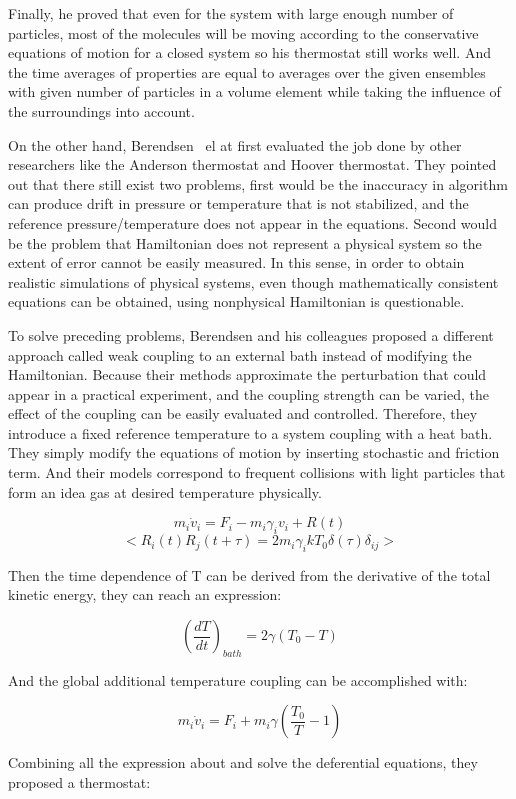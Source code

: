 \documentclass{article}
\begin{document}
\begin{spacing}{1}
Finally, he proved that even for the system with large enough number of particles, most of the molecules will be moving according to the conservative equations of motion for a closed system so his thermostat still works well. And the time averages of properties are equal to averages over the given ensembles with given number of particles in a volume element while taking the influence of the surroundings into account.

On the other hand, Berendsen~\cite{2} el at first evaluated the job done by other researchers like the Anderson thermostat and Hoover thermostat. They pointed out that there still exist two problems, first would be the inaccuracy in algorithm can produce drift in pressure or temperature that is not stabilized, and the reference pressure/temperature does not appear in the equations. Second would be the problem that Hamiltonian does not represent a physical system so the extent of error cannot be easily measured. In this sense, in order to obtain realistic simulations of physical systems, even though mathematically consistent equations can be obtained, using nonphysical Hamiltonian is questionable.

To solve preceding problems, Berendsen and his colleagues proposed a different approach called weak coupling to an external bath instead of modifying the Hamiltonian. Because their methods approximate the perturbation that could appear in a practical experiment, and the coupling strength can be varied, the effect of the coupling can be easily evaluated and controlled.
Therefore, they introduce a fixed reference temperature to a system coupling with a heat bath. They simply modify the equations of motion by inserting stochastic and friction term. And their models correspond to frequent collisions with light particles that form an idea gas at desired temperature physically.

$$m_i\dot v_i=F_i-m_i\gamma_iv_i+R(t)$$
$$<R_i(t)R_j(t+\tau)=2m_i\gamma_ikT_0\delta(\tau)\delta_{ij}>$$

Then the time dependence of T can be derived from the derivative of the total kinetic energy, they can reach an expression:

$$\left(\frac{dT}{dt}\right)_{bath}=2\gamma(T_0-T)$$

And the global additional temperature coupling can be accomplished with:

$$m_i\dot v_i=F_i+m_i\gamma\left(\frac{T_0}{T}-1\right)$$

Combining all the expression about and solve the deferential equations, they proposed a thermostat:


\end{spacing}
\end{document}
